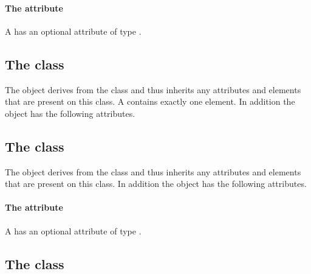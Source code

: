 \paragraph{The \fixttspace{} attribute}

A \LinearGradient has an optional attribute  of type
\RelAbsVector.

\subsection{The  class}
\label{localrenderinformation-class}


The \LocalRenderInformation object derives from the
 class and thus inherits any attributes and
elements that are present on this class.
A \LocalRenderInformation contains exactly one 
element.
In addition the \LocalRenderInformation object has the following
attributes.



\subsection{The  class}
\label{localstyle-class}


The \LocalStyle object derives from the  class and thus
inherits any attributes and elements that are present on this class.
In addition the \LocalStyle object has the following attributes.

\paragraph{The \fixttspace{} attribute}

A \LocalStyle has an optional attribute  of type
.

\subsection{The  class}
\label{polygon-class}


